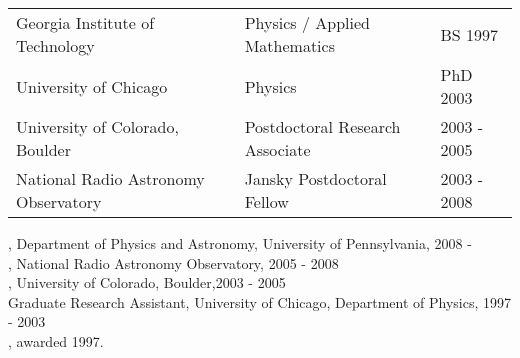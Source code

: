 \newpage
\setcounter{page}{1}


\parskip0pt
{

}

\noindent\begin{tabular}{lll}
{Georgia Institute of Technology} & Physics / Applied Mathematics & BS 1997 \\
{University of Chicago} & Physics & PhD 2003 \\
{University of Colorado, Boulder} & Postdoctoral Research Associate & 2003 - 2005 \\
{National Radio Astronomy Observatory} & Jansky Postdoctoral Fellow & 2003 - 2008 \\
\end{tabular}

{

}, Department of Physics and Astronomy, University of Pennsylvania, 2008 - \\ 
, National Radio Astronomy Observatory, 2005 - 2008 \\
, University of
Colorado, Boulder,2003 - 2005 \\
{Graduate Research Assistant}, University of Chicago, Department of Physics, 1997 - 2003 \\
, awarded 1997.

